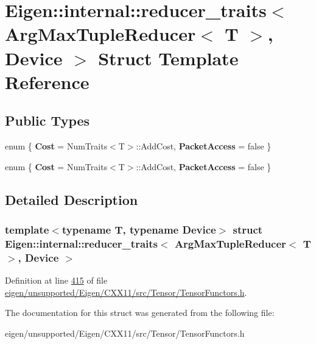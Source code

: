 \hypertarget{struct_eigen_1_1internal_1_1reducer__traits_3_01_arg_max_tuple_reducer_3_01_t_01_4_00_01_device_01_4}{}\section{Eigen\+:\+:internal\+:\+:reducer\+\_\+traits$<$ Arg\+Max\+Tuple\+Reducer$<$ T $>$, Device $>$ Struct Template Reference}
\label{struct_eigen_1_1internal_1_1reducer__traits_3_01_arg_max_tuple_reducer_3_01_t_01_4_00_01_device_01_4}
\subsection*{Public Types}
\begin{DoxyCompactItemize}
\item 
\mbox{\label{struct_eigen_1_1internal_1_1reducer__traits_3_01_arg_max_tuple_reducer_3_01_t_01_4_00_01_device_01_4_a5cd7214b7cf8381be6ba05810014abf7}} 
enum \{ {\bfseries Cost} = Num\+Traits$<$T$>$\+:\+:Add\+Cost, 
{\bfseries Packet\+Access} = false
 \}
\item 
\mbox{\label{struct_eigen_1_1internal_1_1reducer__traits_3_01_arg_max_tuple_reducer_3_01_t_01_4_00_01_device_01_4_a0487dd5b4aff5fffdb403352a89911d4}} 
enum \{ {\bfseries Cost} = Num\+Traits$<$T$>$\+:\+:Add\+Cost, 
{\bfseries Packet\+Access} = false
 \}
\end{DoxyCompactItemize}


\subsection{Detailed Description}
\subsubsection*{template$<$typename T, typename Device$>$\newline
struct Eigen\+::internal\+::reducer\+\_\+traits$<$ Arg\+Max\+Tuple\+Reducer$<$ T $>$, Device $>$}



Definition at line \hyperlink{eigen_2unsupported_2_eigen_2_c_x_x11_2src_2_tensor_2_tensor_functors_8h_source_l00415}{415} of file \hyperlink{eigen_2unsupported_2_eigen_2_c_x_x11_2src_2_tensor_2_tensor_functors_8h_source}{eigen/unsupported/\+Eigen/\+C\+X\+X11/src/\+Tensor/\+Tensor\+Functors.\+h}.



The documentation for this struct was generated from the following file\+:\begin{DoxyCompactItemize}
\item 
eigen/unsupported/\+Eigen/\+C\+X\+X11/src/\+Tensor/\+Tensor\+Functors.\+h\end{DoxyCompactItemize}
